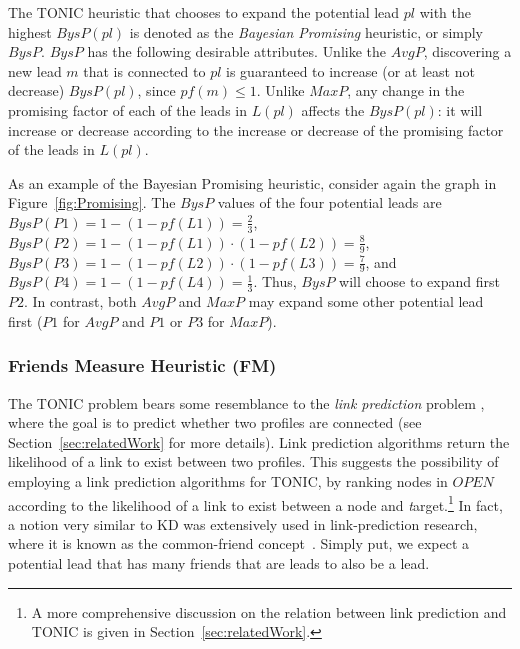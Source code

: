 \documentclass[journal]{IEEEtran}
\newcommand{\target}{{\textit target}}
\begin{document}
\noindent The TONIC heuristic that chooses to expand the potential lead $pl$ with the highest $BysP(pl)$ is denoted as the {\em Bayesian Promising} heuristic, or simply $BysP$. $BysP$ has the following desirable attributes. Unlike the $AvgP$, discovering a new lead $m$ that is connected to $pl$ is guaranteed to increase (or at least not decrease) $BysP(pl)$, since $pf(m)\leq 1$. Unlike $MaxP$, any change in the promising factor of each of the leads in $L(pl)$ affects the $BysP(pl)$: it will increase or decrease according to the increase or decrease of the promising factor of the leads in $L(pl)$.


As an example of the Bayesian Promising heuristic, consider again the graph in Figure~\ref{fig:Promising}. 
The $BysP$ values of the four potential leads are $BysP(P1)=1-(1-pf(L1))=\frac{2}{3}$, 
$BysP(P2)=1-(1-pf(L1))\cdot(1-pf(L2))=\frac{8}{9}$, 
$BysP(P3)=1-(1-pf(L2))\cdot(1-pf(L3))=\frac{7}{9}$, and $BysP(P4)=1-(1-pf(L4))=\frac{1}{3}$. 
Thus, $BysP$ will choose to expand first $P2$. 
In contrast, both $AvgP$ and $MaxP$ may expand some other potential lead first ($P1$ for $AvgP$ and $P1$ or $P3$ for $MaxP$). 




\subsubsection{Friends Measure Heuristic (FM)}
\label{sec:friendsMeasure}

The TONIC problem bears some resemblance to the \emph{link prediction} problem \cite{liben2007link}, where the goal is to predict whether two profiles are connected (see Section~\ref{sec:relatedWork} for more details). Link prediction algorithms return the likelihood of a link to exist between two profiles. This suggests the possibility of employing a link prediction algorithms for TONIC, by ranking nodes in $OPEN$ according to the likelihood of a link to exist between a node and \target .\footnote{A more comprehensive discussion on the relation between link prediction and TONIC is given in Section~\ref{sec:relatedWork}.} In fact, a notion very similar to KD was extensively used in link-prediction research, where it is known as the common-friend concept~\cite{liben2007link}. Simply put, we expect a potential lead that has many friends that are leads to also be a lead.
\end{document}
